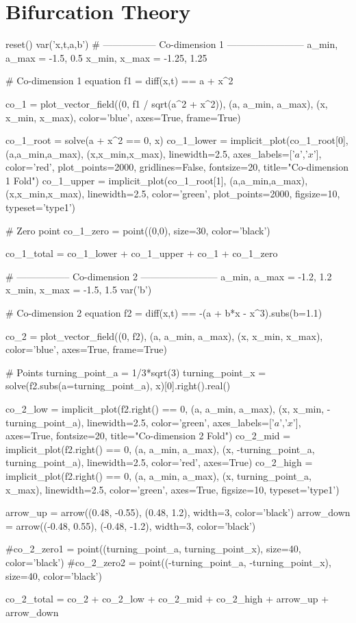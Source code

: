 \documentclass[10pt]{beamer}
\begin{document}
\section{Bifurcation Theory}
\begin{sagesilent}
	reset()
	var('x,t,a,b')
		# ----------------- Co-dimension 1 ------------------------
	a_min, a_max = -1.5, 0.5
	x_min, x_max = -1.25, 1.25

	# Co-dimension 1 equation
	f1 = diff(x,t) == a + x^2

	co_1 = plot_vector_field((0, f1 / sqrt(a^2 + x^2)), (a, a_min, a_max), (x, x_min, x_max), color='blue', axes=True, frame=True)


	co_1_root = solve(a + x^2 == 0, x)
	co_1_lower = implicit_plot(co_1_root[0], (a,a_min,a_max), (x,x_min,x_max), linewidth=2.5, axes_labels=['$a$','$x$'], color='red', plot_points=2000, gridlines=False, fontsize=20, title="Co-dimension 1 Fold")
	co_1_upper = implicit_plot(co_1_root[1], (a,a_min,a_max), (x,x_min,x_max), linewidth=2.5, color='green', plot_points=2000, figsize=10, typeset='type1')

	# Zero point
	co_1_zero = point((0,0), size=30, color='black')

	co_1_total = co_1_lower + co_1_upper + co_1 + co_1_zero

	# ----------------- Co-dimension 2 ------------------------
	a_min, a_max = -1.2, 1.2
	x_min, x_max = -1.5, 1.5
	var('b')

	# Co-dimension 2 equation
	f2 = diff(x,t) == -(a + b*x - x^3).subs(b=1.1)

	co_2 = plot_vector_field((0, f2), (a, a_min, a_max), (x, x_min, x_max), color='blue', axes=True, frame=True)

	# Points
	turning_point_a = 1/3*sqrt(3)
	turning_point_x = solve(f2.subs(a=turning_point_a), x)[0].right().real()

	co_2_low = implicit_plot(f2.right() == 0, (a, a_min, a_max), (x, x_min, -turning_point_a), linewidth=2.5, color='green', axes_labels=['$a$','$x$'], axes=True, fontsize=20, title="Co-dimension 2 Fold")
	co_2_mid = implicit_plot(f2.right() == 0, (a, a_min, a_max), (x, -turning_point_a, turning_point_a), linewidth=2.5, color='red', axes=True)
	co_2_high = implicit_plot(f2.right() == 0, (a, a_min, a_max), (x, turning_point_a, x_max), linewidth=2.5, color='green', axes=True, figsize=10, typeset='type1')

	arrow_up = arrow((0.48, -0.55), (0.48, 1.2), width=3, color='black')
	arrow_down = arrow((-0.48, 0.55), (-0.48, -1.2), width=3, color='black')

	#co_2_zero1 = point((turning_point_a, turning_point_x), size=40, color='black')
	#co_2_zero2 = point((-turning_point_a, -turning_point_x), size=40, color='black')

	co_2_total = co_2 + co_2_low + co_2_mid + co_2_high + arrow_up + arrow_down
\end{sagesilent}
\end{document}
